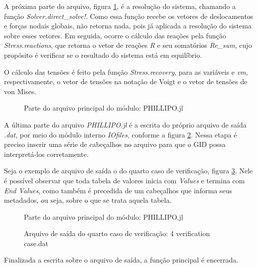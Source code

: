 A próxima parte do arquivo, figura \ref{fig:phillipo.jl_6}, é a resolução do sistema, chamando a função \emph{Solver.direct\_solve!}. Como essa função recebe os vetores de deslocamentos e forças nodais globais, não retorna nada, pois já aplicada a resolução do sistema sobre esses vetores. Em seguida, ocorre o cálculo das reações pela função \emph{Stress.reactions}, que retorna o vetor de reações \emph{R} e seu somatórios \emph{Re\_sum}, cujo propósito é verificar se o resultado do sistema está em equilíbrio.

O cálculo das tensões é feito pela função \emph{Stress.recovery}, para as variáveis \emph{\sigma} e \emph{\sigma vm}, respectivamente, o vetor de tensões na notação de Voigt e o vetor de tensões de von Mises.

\begin{figure}[hbtp]
    \caption{Parte do arquivo principal do módulo: PHILLIPO.jl}
    
    \label{fig:phillipo.jl_6}
\end{figure}

A última parte do arquivo \emph{PHILLIPO.jl} é a escrita do próprio arquivo de saída \emph{.dat}, por meio do módulo interno \emph{IOfiles}, conforme a figura \ref{fig:phillipo.jl_7}. Nessa etapa é preciso inserir uma série de cabeçalhos no arquivo para que o GID possa interpretá-los corretamente. 

Seja o exemplo de arquivo de saída o do quarto caso de verificação, figura \ref{fig:case_verification.pos}. Nele é possível observar que toda tabela de valores inicia com \emph{Values} e termina com \emph{End Values}, como também é precedida de um cabeçalhos que informa seus metadados, ou seja, sobre o que se trata aquela tabela. 

\begin{figure}[hbtp]
    \caption{Parte do arquivo principal do módulo: PHILLIPO.jl}
    
    \label{fig:phillipo.jl_7}
\end{figure}

\begin{figure}[hbtp]
    \caption{Arquivo de saída do quarto caso de verificação: 4 verification case.dat}
    
    \label{fig:case_verification.pos}
\end{figure}

Finalizada a escrita sobre o arquivo de saída, a função principal é encerrada.